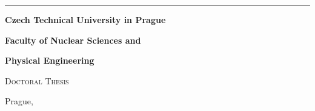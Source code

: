 {\begin{titlepage}
\begin{minipage}[b][\textheight]{0.15\textwidth}
    \end{minipage}
    \hspace{0.05\textwidth}
    \doccol \rule{2pt}{\textheight}
    \hspace{0.05\textwidth}
    \begin{minipage}[b][\textheight]{0.7\textwidth}
      \begin{minipage}[b]{\textwidth}
        \centering \doccol \Large
        \textbf{Czech Technical University in Prague} \par
        \textbf{Faculty of Nuclear Sciences and} \par
        \textbf{Physical Engineering}
      \end{minipage} \par
      \vfill
      \begin{minipage}[b]{\textwidth}
        \centering \doccol \huge \textsc{Doctoral Thesis}
      \end{minipage} \par
      \vspace{1cm}
      \begin{minipage}[b]{\textwidth}
        \centering  \doccol \huge \textbf{\@title}
      \end{minipage} \par
      \vfill
      \begin{minipage}[b]{0.95\textwidth}
        Prague, \@Year
        \hfill
        \@author
      \end{minipage}
    \end{minipage}
  \end{titlepage}
  \cleardoublepage

}
